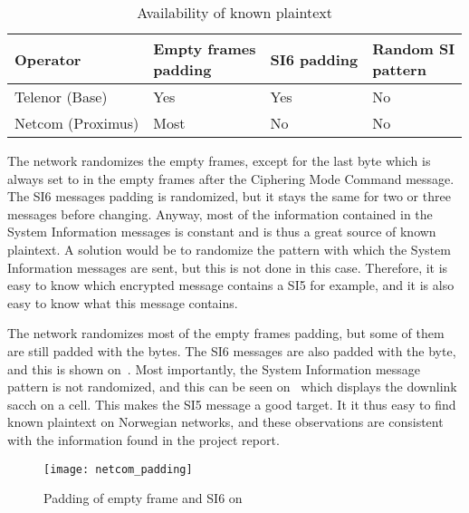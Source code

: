       \begin{table}[h]
        \centering
        \begin{tabular}{@{}llll@{}}
          \toprule
          Operator & \parbox[t]{2.2cm}{Empty frames\\ padding} & SI6
          padding & \parbox[t]{1.7cm}{Random SI\\ pattern}\\
          \midrule
          Telenor (Base)    & Yes   & Yes & No    \\
          Netcom (Proximus) & Most  & No  & No    \\
          \bottomrule
        \end{tabular}
        \caption{Availability of known plaintext}
        \label{tab:plaintext}
      \end{table}

      The  network randomizes the empty frames, except for
      the last byte which is always set to  in the empty frames
      after the Ciphering Mode Command message. The SI6 messages padding
      is randomized, but it stays the same for two or three messages
      before changing. Anyway, most of the information contained in the
      System Information messages is constant and is thus a great source
      of known plaintext. A solution would be to randomize the pattern
      with which the System Information messages are sent, but this is
      not done in this case. Therefore, it is easy to know which
      encrypted message contains a SI5 for example, and it is also easy
      to know what this message contains.
      
      The  network randomizes most of the empty frames
      padding, but some of them are still padded with the 
      bytes. The SI6 messages are also padded with the  byte,
      and this is shown on~. Most importantly,
      the System Information message pattern is not randomized, and this
      can be seen on~ which displays the
      downlink \gls{sacch} on a  cell. This makes the SI5
      message a good target. It it thus easy to find known plaintext on
      Norwegian networks, and these observations are consistent with the
      information found in the  project report.

      \begin{figure}
        \centering
        \texttt{[image: netcom\_padding]}
        \caption{Padding of empty frame and SI6 on }
        \label{fig:netcom_padding}
      \end{figure}

